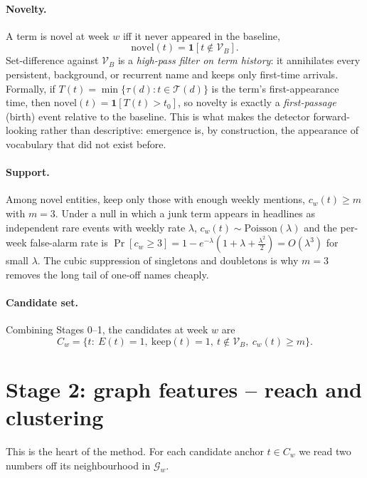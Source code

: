 \documentclass[11pt]{article}
\newcommand{\ind}[1]{\mathbf{1}\!\left[#1\right]}        %
\newcommand{\Terms}{\mathcal{T}}                          %
\newcommand{\Base}{\mathcal{V}_{B}}                       %
\theoremstyle{definition}
\theoremstyle{remark}
\begin{document}
\paragraph{Novelty.}
A term is novel at week $w$ iff it never appeared in the baseline,
\begin{equation}
\mathrm{novel}(t)=\ind{t\notin\Base}.
\end{equation}
Set-difference against $\Base$ is a \emph{high-pass filter on term history}: it annihilates
every persistent, background, or recurrent name and keeps only first-time arrivals. Formally,
if $T(t)=\min\{\tau(d):t\in\Terms(d)\}$ is the term's first-appearance time, then
$\mathrm{novel}(t)=\ind{T(t)>t_0}$, so novelty is exactly a \emph{first-passage} (birth)
event relative to the baseline. This is what makes the detector forward-looking rather than
descriptive: emergence is, by construction, the appearance of vocabulary that did not exist
before.

\paragraph{Support.}
Among novel entities, keep only those with enough weekly mentions, $c_w(t)\ge m$ with $m=3$.
Under a null in which a junk term appears in headlines as independent rare events with weekly
rate $\lambda$, $c_w(t)\sim\mathrm{Poisson}(\lambda)$ and the per-week false-alarm rate is
$\Pr[c_w\ge 3]=1-e^{-\lambda}(1+\lambda+\tfrac{\lambda^2}{2})=O(\lambda^3)$ for small
$\lambda$. The cubic suppression of singletons and doubletons is why $m=3$ removes the long
tail of one-off names cheaply.

\paragraph{Candidate set.}
Combining Stages 0--1, the candidates at week $w$ are
\begin{equation}
C_w=\bigl\{t:\ E(t)=1,\ \mathrm{keep}(t)=1,\ t\notin\Base,\ c_w(t)\ge m\bigr\}.
\end{equation}

\section{Stage 2: graph features -- reach and clustering}\label{sec:stage2}

This is the heart of the method. For each candidate anchor $t\in C_w$ we read two numbers off
its neighbourhood in $\mathcal{G}_w$.
\end{document}
